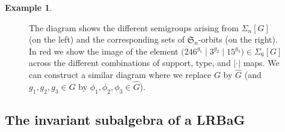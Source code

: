 \documentclass[11pt, oneside, reqno]{amsart}
\theoremstyle{definition}
\newtheorem{example}[theorem]{Example}
\numberwithin{equation}{section}
\def \sym{\mathfrak{S}}
\def \wh{\widehat}
\def \gsetcomposition{{\Sigma_n[G]}}
\def \hsiao {{\gsetcomposition}}
\newcommand{\abs}[1]{|{#1}|} 				%
\begin{document}
\begin{example}
\begin{figure}[!ht]
\begin{center}
     \end{center}
     \caption{  The diagram shows the different semigroups arising from $\hsiao$ (on the left)
                and the corresponding sets of $\sym_n$-orbits (on the right).
                In red we show the image of the element $\big( 246^{g_1} \mid 3^{g_2} \mid 15^{g_3} \big) \in \Sigma_6[G]$ across the different combinations of support, type, and $\abs{\cdot}$ maps. We can construct a similar diagram where we replace $G$ by $\wh{G}$ (and $g_1,g_2,g_3 \in G$ by $\phi_1,\phi_2,\phi_3 \in \wh{G}$).
            }
     \label{fig:hsiaotypediagram}
    \end{figure}
\end{example}



\subsection{The invariant subalgebra of a LRBaG}\label{sec:invarLRBaG}
\end{document}
